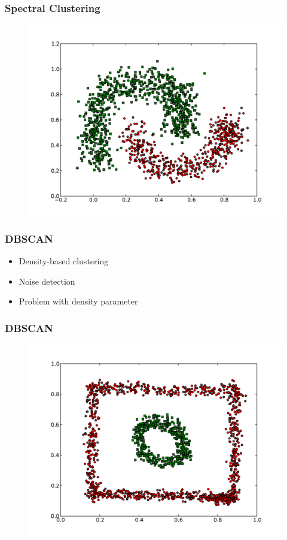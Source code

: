 \documentclass{beamer}
\begin{document}
\begin{frame}
\frametitle{Spectral Clustering}
    \begin{figure}[]
    \includegraphics[scale=0.5]{spectral_half-moons.pdf}
    \end{figure}
\end{frame}



\begin{frame}
\frametitle{DBSCAN}
    \begin{itemize}
	\item Density-based clustering
    	\item Noise detection
   	\item Problem with density parameter
    \end{itemize}
\end{frame}

\begin{frame}
\frametitle{DBSCAN}
    \begin{figure}[]
    \includegraphics[scale=0.5]{dbscan_circle-weird.pdf}
    \end{figure}
\end{frame}
\end{document}
